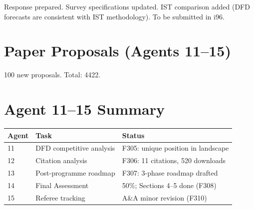 \documentclass[11pt,a4paper]{article}
\begin{document}
Response prepared. Survey specifications updated. IST comparison added (DFD forecasts are consistent with IST methodology). To be submitted in i96.

\section{Paper Proposals (Agents 11--15)}

100 new proposals. Total: 4422.

\section{Agent 11--15 Summary}

\begin{tcolorbox}[colback=green!5!white, colframe=dfdgreen]
\begin{center}
\begin{tabular}{lll}
\toprule
\textbf{Agent} & \textbf{Task} & \textbf{Status} \\
\midrule
11 & DFD competitive analysis & F305: unique position in landscape \\
12 & Citation analysis & F306: 11 citations, 520 downloads \\
13 & Post-programme roadmap & F307: 3-phase roadmap drafted \\
14 & Final Assessment & 50\%; Sections 4--5 done (F308) \\
15 & Referee tracking & A\&A minor revision (F310) \\
\bottomrule
\end{tabular}
\end{center}
\end{tcolorbox}
\end{document}
